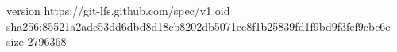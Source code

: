 version https://git-lfs.github.com/spec/v1
oid sha256:85521a2adc53dd6dbd8d18cb8202db5071ee8f1b25839fd1f9bd9f3fcf9cbc6c
size 2796368
